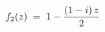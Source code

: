 \documentclass[preview]{standalone}
\begin{document}
\begin{align*}
\special{dvisvgm:raw <g id='unique000'>}f_2(z) \;=\; 1 - \dfrac{(1-i)\,z}{2}\special{dvisvgm:raw </g>}
\end{align*}
\end{document}
